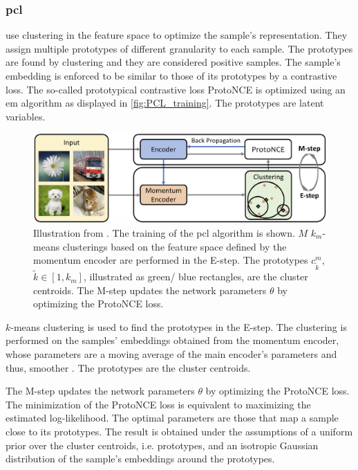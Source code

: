 \subsubsection{\acl{pcl}}\label{subsec:PCL}

\citet{PCL_2021} use clustering in the feature space to optimize the sample's representation.
They assign multiple prototypes of different granularity to each sample.
The prototypes are found by clustering and 
they are considered positive samples.
The sample's embedding is enforced to be similar to those of its prototypes by a contrastive loss.
The so-called prototypical contrastive loss ProtoNCE is optimized using an \ac{em} algorithm 
as displayed in \autoref{fig:PCL_training}.
The prototypes are latent variables.

\begin{figure}[!htb] %
    \centering
    \includegraphics[width=360pt]{images/PCL_training.png}
    \caption{Illustration from \citet{PCL_2021}.
    The training of the \ac{pcl} algorithm is shown.
    $M$ $k_m$-means clusterings based on the feature space defined by the momentum encoder 
    are performed in the E-step.
    The prototypes $c^m_{\tilde{k}}$, $\tilde{k} \in [1, k_m]$, illustrated as green/ blue rectangles, 
    are the cluster centroids.
    The M-step updates the network parameters $\theta$ by optimizing the ProtoNCE loss.
    }
    \label{fig:PCL_training}
\end{figure}

$k$-means clustering is used to find the prototypes in the E-step.
The clustering is performed on the samples' embeddings obtained from the momentum encoder, 
whose parameters are a moving average of the main encoder's parameters and thus, smoother \citet{PCL_2021}.
The prototypes are the cluster centroids.

The M-step updates the network parameters $\theta$ by optimizing the ProtoNCE loss.
The minimization of the ProtoNCE loss is equivalent to maximizing the estimated log-likelihood.
The optimal parameters are those that map a sample close to its prototypes.
The result is obtained under the assumptions of a uniform prior over the cluster centroids, i.e. prototypes,
and an isotropic Gaussian distribution of the sample's embeddings around the prototypes.

